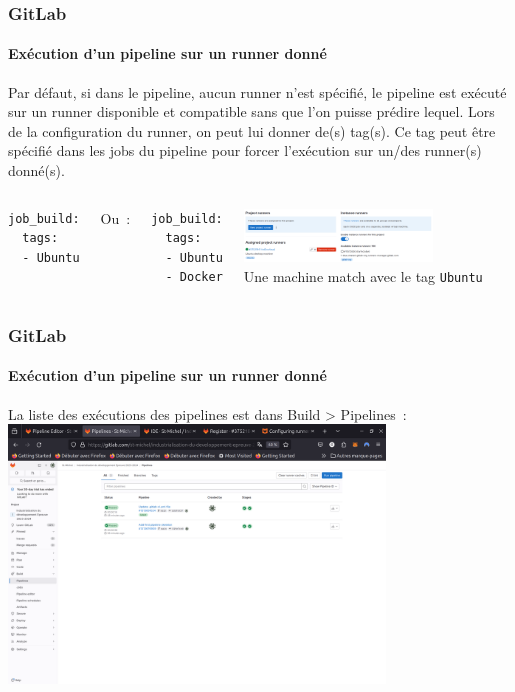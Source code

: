 \documentclass{beamer}
\begin{document}
    \begin{frame}[fragile]
        \frametitle{GitLab}
        \framesubtitle{Exécution d'un pipeline sur un runner donné}
        \transdissolve
        Par défaut, si dans le pipeline, aucun runner n'est spécifié, le pipeline est exécuté sur un runner disponible et compatible sans que l'on puisse prédire lequel.
        \bigbreak
        Lors de la configuration du runner, on peut lui donner de(s) tag(s).
        \bigbreak
        Ce tag peut être spécifié dans les jobs du pipeline pour forcer l'exécution sur un/des runner(s) donné(s).
        \begin{columns}
            \begin{lstlisting}[basicstyle=\ttfamily\tiny]
job_build:
  tags:
  - Ubuntu
            \end{lstlisting}
            Ou~:
            \begin{lstlisting}[basicstyle=\ttfamily\tiny]
job_build:
  tags:
  - Ubuntu
  - Docker
            \end{lstlisting}
            \centering
            \includegraphics[width=5cm]{image/gitlab-runners} \\ Une machine match avec le tag \lstinline{Ubuntu} \\
        \end{columns}
    \end{frame}

    \begin{frame}
        \frametitle{GitLab}
        \framesubtitle{Exécution d'un pipeline sur un runner donné}
        \transdissolve
        La liste des exécutions des pipelines est dans Build > Pipelines~:
        \bigbreak
        \centering
        \includegraphics[width=10cm]{image/gitlab-pipelines-executions}
    \end{frame}
\end{document}
